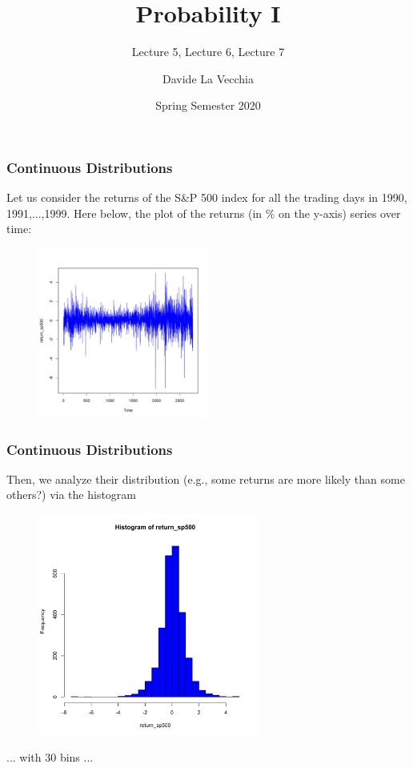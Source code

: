 \documentclass[notes=show,smaller,handout]{beamer}
\begin{document}
\title[S110015]{Probability I}
\subtitle{Lecture 5, Lecture 6, Lecture 7}
\author[La Vecchia]{Davide La Vecchia}
\date{Spring Semester 2020}
\maketitle



\begin{frame}%

\frametitle{Continuous Distributions}

\begin{example}
Let us consider the returns of the S\&P 500 index for all the trading days in 1990, 1991,...,1999. Here below, the plot of the returns (in $\%$ on the y-axis)
series over time:
\begin{figure}[ptb]\centering
\includegraphics[width=0.5\textwidth,height=0.5\textheight]{R1.pdf}
\end{figure}
\end{example}
\end{frame}

\begin{frame}%

\frametitle{Continuous Distributions}

\begin{example}[cont'd]
Then, we analyze their distribution (e.g., some returns are more likely than some others?) via the histogram 
\begin{figure}[ptb]\centering
\includegraphics[width=0.65\textwidth,height=0.55\textheight]{sp_hist1.pdf}
\end{figure}
... with 30 bins ...
\end{example}
\end{frame}
\end{document}
